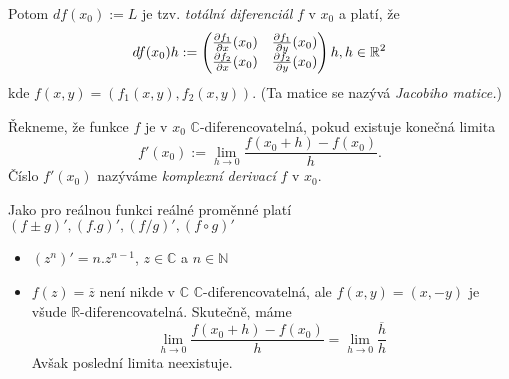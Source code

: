 \begin{note}
Potom $df(x_0):=L$ je tzv. \textit{totální diferenciál} $f$ v $x_0$ a platí, že $$df(x_0)h:=\begin{pmatrix}
\frac{\partial f_1}{\partial x}(x_0) & \frac{\partial f_1}{\partial y}(x_0)\\
\frac{\partial f_2}{\partial x}(x_0) & \frac{\partial f_2}{\partial y}(x_0)
\end{pmatrix}h,\vspace{5mm} h\in \mathbb{R}^2$$
kde $f(x,y) = (f_1(x,y),f_2(x,y)).$ (Ta matice se nazývá \textit{Jacobiho matice.})
\end{note} 


\begin{definition}
Řekneme, že funkce $f$ je v $x_0$ $\mathbb{C}$-diferencovatelná, pokud existuje konečná limita $$f'(x_0):= \lim_{h \to 0}\frac{f(x_0+h)-f(x_0)}{h}.$$ Číslo $f'(x_0)$ nazýváme \textit{komplexní derivací} $f$ v $x_0$. 
\end{definition}  

\begin{note}
Jako pro reálnou funkci reálné proměnné platí $(f\pm g)', (f.g)', (f/g)', (f\circ g)'$
\end{note} 

\begin{example}

\begin{itemize}
    \item $(z^n)' = n.z^{n-1}$, $z\in \mathbb{C}$ a $n\in \mathbb{N}$
    \item $f(z) = \overline{z}$ není nikde v $\mathbb{C}$ $\mathbb{C}$-diferencovatelná, ale $f(x,y) = (x,-y)$ je všude $\mathbb{R}$-diferencovatelná. Skutečně, máme $$\lim_{h\to 0}\frac{f(x_0+h)-f(x_0)}{h} = \lim_{h\to 0}\frac{\overline{h}}{h}$$ Avšak poslední limita neexistuje.
\end{itemize}
\end{example}



